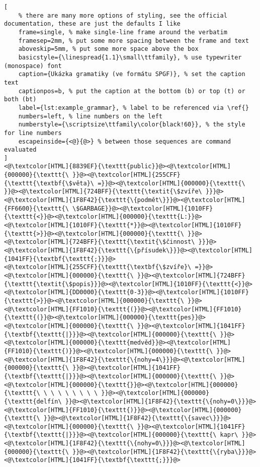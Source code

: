 \begin{lstlisting}[
	% there are many more options of styling, see the official documentation, these are just the defaults I like
	frame=single, % make single-line frame around the verbatim
	framesep=2mm, % put some more spacing between the frame and text
	aboveskip=5mm, % put some more space above the box
	basicstyle={\linespread{1.1}\small\ttfamily}, % use typewriter (monospace) font
	caption={Ukázka gramatiky (ve formátu SPGF)}, % set the caption text
	captionpos=b, % put the caption at the bottom (b) or top (t) or both (bt)
    label={lst:example_grammar}, % label to be referenced via \ref{}
	numbers=left, % line numbers on the left
	numberstyle={\scriptsize\ttfamily\color{black!60}}, % the style for line numbers
	escapeinside={<@}{@>} % between those sequences are command evaluated
]
<@\textcolor[HTML]{8839EF}{\texttt{public}}@><@\textcolor[HTML]{000000}{\texttt{\ }}@><@\textcolor[HTML]{255CFF}{\texttt{\textbf{\$věta}\ =}}@><@\textcolor[HTML]{000000}{\texttt{\ }}@><@\textcolor[HTML]{724BFF}{\texttt{\textit{\$zvíře\ }}}@><@\textcolor[HTML]{1F8F42}{\texttt{\{podmět\}}}@><@\textcolor[HTML]{FF6600}{\texttt{\ \$GARBAGE}}@><@\textcolor[HTML]{1010FF}{\texttt{<}}@><@\textcolor[HTML]{000000}{\texttt{L:}}@><@\textcolor[HTML]{1010FF}{\texttt{*}}@><@\textcolor[HTML]{1010FF}{\texttt{>}}@><@\textcolor[HTML]{000000}{\texttt{\ }}@><@\textcolor[HTML]{724BFF}{\texttt{\textit{\$činnost\ }}}@><@\textcolor[HTML]{1F8F42}{\texttt{\{přísudek\}}}@><@\textcolor[HTML]{1041FF}{\textbf{\texttt{;}}}@>
<@\textcolor[HTML]{255CFF}{\texttt{\textbf{\$zvíře}\ =}}@><@\textcolor[HTML]{000000}{\texttt{\ }}@><@\textcolor[HTML]{724BFF}{\texttt{\textit{\$popis}}}@><@\textcolor[HTML]{1010FF}{\texttt{<}}@><@\textcolor[HTML]{DD0000}{\texttt{0-3}}@><@\textcolor[HTML]{1010FF}{\texttt{>}}@><@\textcolor[HTML]{000000}{\texttt{\ }}@><@\textcolor[HTML]{FF1010}{\texttt{(}}@><@\textcolor[HTML]{FF1010}{\texttt{(}}@><@\textcolor[HTML]{000000}{\texttt{pes}}@><@\textcolor[HTML]{000000}{\texttt{\ }}@><@\textcolor[HTML]{1041FF}{\textbf{\texttt{|}}}@><@\textcolor[HTML]{000000}{\texttt{\ }}@><@\textcolor[HTML]{000000}{\texttt{medvěd}}@><@\textcolor[HTML]{FF1010}{\texttt{)}}@><@\textcolor[HTML]{000000}{\texttt{\ }}@><@\textcolor[HTML]{1F8F42}{\texttt{\{nohy=4\}}}@><@\textcolor[HTML]{000000}{\texttt{\ }}@><@\textcolor[HTML]{1041FF}{\textbf{\texttt{|}}}@><@\textcolor[HTML]{000000}{\texttt{\ }}@>
<@\textcolor[HTML]{000000}{\texttt{}}@><@\textcolor[HTML]{000000}{\texttt{\ \ \ \ \ \ \ \ \ }}@><@\textcolor[HTML]{000000}{\texttt{delfín\ }}@><@\textcolor[HTML]{1F8F42}{\texttt{\{nohy=0\}}}@><@\textcolor[HTML]{FF1010}{\texttt{)}}@><@\textcolor[HTML]{000000}{\texttt{\ }}@><@\textcolor[HTML]{1F8F42}{\texttt{\{savec\}}}@><@\textcolor[HTML]{000000}{\texttt{\ }}@><@\textcolor[HTML]{1041FF}{\textbf{\texttt{|}}}@><@\textcolor[HTML]{000000}{\texttt{\ kapr\ }}@><@\textcolor[HTML]{1F8F42}{\texttt{\{nohy=0\}}}@><@\textcolor[HTML]{000000}{\texttt{\ }}@><@\textcolor[HTML]{1F8F42}{\texttt{\{ryba\}}}@><@\textcolor[HTML]{1041FF}{\textbf{\texttt{;}}}@>

\end{lstlisting}
